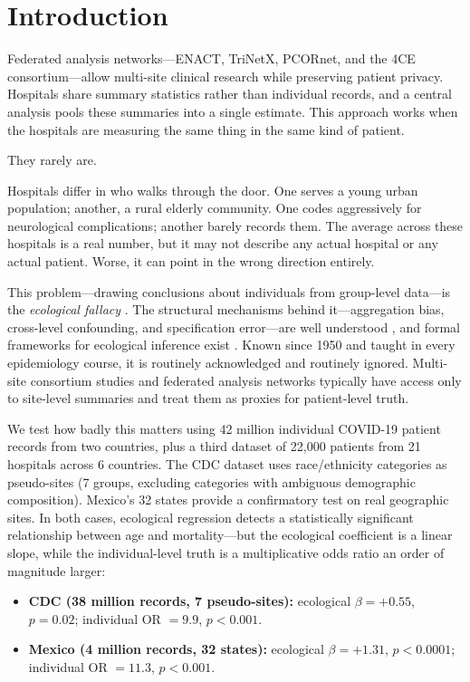 \documentclass[11pt]{article}
\begin{document}
\section{Introduction}

Federated analysis networks---ENACT, TriNetX, PCORnet, and the 4CE
consortium---allow multi-site clinical research while preserving patient
privacy.  Hospitals share summary statistics rather than individual
records, and a central analysis pools these summaries into a single
estimate.  This approach works when the hospitals are measuring the same
thing in the same kind of patient.

They rarely are.

Hospitals differ in who walks through the door.  One serves a young urban
population; another, a rural elderly community.  One codes aggressively for
neurological complications; another barely records them.  The average across
these hospitals is a real number, but it may not describe any actual hospital
or any actual patient.  Worse, it can point in the wrong direction entirely.

This problem---drawing conclusions about individuals from group-level
data---is the \emph{ecological fallacy}
\cite{robinson1950ecological}.  The structural mechanisms behind it---aggregation
bias, cross-level confounding, and specification error---are well understood
\cite{greenland1992ecological,greenland2001ecologic}, and formal frameworks
for ecological inference exist \cite{king1997ecological,wakefield2003ecological,wakefield2008ecologic}.
Known since 1950 and taught in every
epidemiology course, it is routinely acknowledged and routinely ignored.
Multi-site consortium studies and federated analysis networks typically have
access only to site-level summaries and treat them as proxies for
patient-level truth.

We test how badly this matters using 42 million individual COVID-19 patient
records from two countries, plus a third dataset of 22,000 patients from 21
hospitals across 6 countries.  The CDC dataset uses race/ethnicity categories
as pseudo-sites (7 groups, excluding categories with ambiguous demographic
composition).  Mexico's 32 states provide a confirmatory test on real
geographic sites.  In both cases, ecological regression detects a
statistically significant relationship between age and mortality---but the
ecological coefficient is a linear slope, while the individual-level truth
is a multiplicative odds ratio an order of magnitude larger:

\begin{itemize}
\item \textbf{CDC (38 million records, 7 pseudo-sites):} ecological
$\beta = +0.55$, $p = 0.02$; individual OR $= 9.9$, $p < 0.001$.

\item \textbf{Mexico (4 million records, 32 states):} ecological
$\beta = +1.31$, $p < 0.0001$; individual OR $= 11.3$, $p < 0.001$.
\end{itemize}
\end{document}
